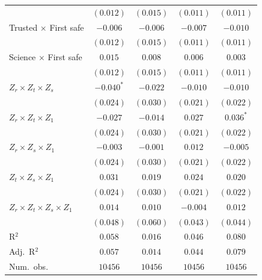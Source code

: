 \begin{table}
\begin{center}
\begin{tabular}{l c c || c c}
                                       & $(0.012)$      & $(0.015)$      & $(0.011)$      & $(0.011)$      \\
Trusted $\times$ First safe            & $-0.006$       & $-0.006$       & $-0.007$       & $-0.010$       \\
                                       & $(0.012)$      & $(0.015)$      & $(0.011)$      & $(0.011)$      \\
Science $\times$ First safe            & $0.015$        & $0.008$        & $0.006$        & $0.003$        \\
                                       & $(0.012)$      & $(0.015)$      & $(0.011)$      & $(0.011)$      \\
\addlinespace[3pt]\hline
$Z_r \times Z_t \times Z_s$            & $-0.040^{*}$   & $-0.022$       & $-0.010$       & $-0.010$       \\
                                       & $(0.024)$      & $(0.030)$      & $(0.021)$      & $(0.022)$      \\
$Z_r \times Z_t \times Z_1$            & $-0.027$       & $-0.014$       & $0.027$        & $0.036^{*}$    \\
                                       & $(0.024)$      & $(0.030)$      & $(0.021)$      & $(0.022)$      \\
$Z_r \times Z_s \times Z_1$            & $-0.003$       & $-0.001$       & $0.012$        & $-0.005$       \\
                                       & $(0.024)$      & $(0.030)$      & $(0.021)$      & $(0.022)$      \\
$Z_t \times Z_s \times Z_1$            & $0.031$        & $0.019$        & $0.024$        & $0.020$        \\
                                       & $(0.024)$      & $(0.030)$      & $(0.021)$      & $(0.022)$      \\
$Z_r \times Z_t \times Z_s \times Z_1$ & $0.014$        & $0.010$        & $-0.004$       & $0.012$        \\
                                       & $(0.048)$      & $(0.060)$      & $(0.043)$      & $(0.044)$      \\
\hline
R$^2$                                  & $0.058$        & $0.016$        & $0.046$        & $0.080$        \\
Adj.\ R$^2$                            & $0.057$        & $0.014$        & $0.044$        & $0.079$        \\
Num.\ obs.                             & $10456$        & $10456$        & $10456$        & $10456$        \\

\end{tabular}
\end{center}
\end{table}
